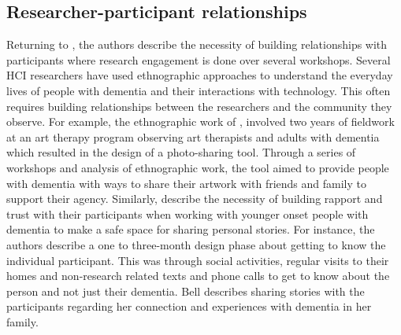 \subsection{Researcher-participant relationships}
\label{BL:Trust}
Returning to \cite{lindsay_empathy_2012}, the authors describe the necessity of building relationships with participants where research engagement is done over several workshops. Several HCI researchers have used ethnographic approaches to understand the everyday lives of people with dementia and their interactions with technology. This often requires building relationships between the researchers and the community they observe. For example, the ethnographic work of \cite{lazar_supporting_2017}, involved two years of fieldwork at an art therapy program observing art therapists and adults with dementia which resulted in the design of a photo-sharing tool. Through a series of workshops and analysis of ethnographic work, the tool aimed to provide people with dementia with ways to share their artwork with friends and family to support their agency. Similarly, \cite{bell2019collaborative} describe the necessity of building rapport and trust with their participants when working with younger onset people with dementia to make a safe space for sharing personal stories. For instance, the authors describe a one to three-month design phase about getting to know the individual participant. This was through social activities, regular visits to their homes and non-research related texts and phone calls to get to know about the person and not just their dementia. Bell describes sharing stories with the participants regarding her connection and experiences with dementia in her family. 


